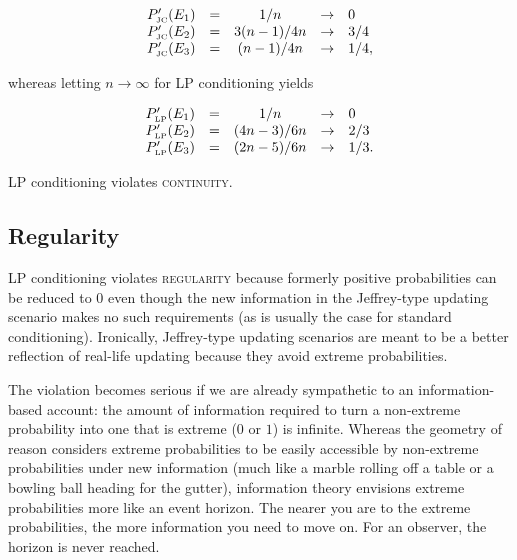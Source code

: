 \documentclass[phd,12pt,oneside]{ubcthesis}
\begin{document}
\begin{equation}
  \label{eq:sherlockcontjc}
  \begin{array}{rcccl}
  P'_{\mbox{\tiny JC}}(E_{1})&=&1/n&\rightarrow&0\\
  P'_{\mbox{\tiny JC}}(E_{2})&=&3(n-1)/4n&\rightarrow&3/4\\
  P'_{\mbox{\tiny JC}}(E_{3})&=&(n-1)/4n&\rightarrow&1/4,
\end{array}
\end{equation}

{\noindent}whereas letting $n\rightarrow\infty$ for LP conditioning yields

\begin{equation}
  \label{eq:sherlockcontlp}
  \begin{array}{rcccl}
  P'_{\mbox{\tiny LP}}(E_{1})&=&1/n&\rightarrow&0\\
  P'_{\mbox{\tiny LP}}(E_{2})&=&(4n-3)/6n&\rightarrow&2/3\\
  P'_{\mbox{\tiny LP}}(E_{3})&=&(2n-5)/6n&\rightarrow&1/3.
\end{array}
\end{equation}

{\noindent}LP conditioning violates \textsc{continuity}.

\subsection{Regularity}
\label{subsec:shoedaic}

LP conditioning violates \textsc{regularity} because formerly positive
probabilities can be reduced to $0$ even though the new information in
the Jeffrey-type updating scenario makes no such requirements (as is
usually the case for standard conditioning). Ironically, Jeffrey-type
updating scenarios are meant to be a better reflection of real-life
updating because they avoid extreme probabilities. 

The violation becomes serious if we are already sympathetic to an
infor\-ma\-tion-based account: the amount of information required to
turn a non-extreme probability into one that is extreme ($0$ or $1$)
is infinite. Whereas the geometry of reason considers extreme
probabilities to be easily accessible by non-extreme probabilities
under new information (much like a marble rolling off a table or a
bowling ball heading for the gutter), information theory envisions
extreme probabilities more like an event horizon. The nearer you are
to the extreme probabilities, the more information you need to move
on. For an observer, the horizon is never reached.
\end{document}
